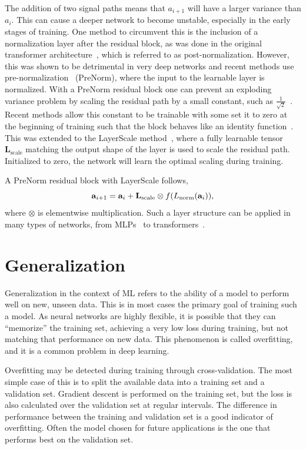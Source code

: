 The addition of two signal paths means that $a_{i+1}$ will have a larger variance than $a_i$.
This can cause a deeper network to become unstable, especially in the early stages of training.
One method to circumvent this is the inclusion of a normalization layer after the residual block, as was done in the original transformer architecture~\cite{Attention}, which is referred to as post-normalization.
However, this was shown to be detrimental in very deep networks and recent methods use pre-normalization~\cite{PreLN} (PreNorm), where the input to the learnable layer is normalized.
With a PreNorm residual block one can prevent an exploding variance problem by scaling the residual path by a small constant, such as $\frac{1}{\sqrt{2}}$~\cite{StyleGAN2}.
Recent methods allow this constant to be trainable with some set it to zero at the beginning of training such that the block behaves like an identity function~\cite{ReZero, SkipInit, Fixup}.
This was extended to the LayerScale method~\cite{GoingDeeper}, where a fully learnable tensor $\mathbf{L}_\text{scale}$ matching the output shape of the layer is used to scale the residual path.
Initialized to zero, the network will learn the optimal scaling during training.

A PreNorm residual block with LayerScale follows,
\begin{equation}
    \mathbf{a}_{i+1} = \mathbf{a}_i + \mathbf{L}_\text{scale} \otimes f( L_{\text{norm}}(\mathbf{a}_i) ),
\end{equation}
where $\otimes$ is elementwise multiplication.
Such a layer structure can be applied in many types of networks, from MLPs~\cite{InvertedBottleneck} to transformers~\cite{GoingDeeper}.

\section{Generalization}

Generalization in the context of ML refers to the ability of a model to perform well on new, unseen data.
This is in most cases the primary goal of training such a model.
As neural networks are highly flexible, it is possible that they can ``memorize'' the training set, achieving a very low loss during training, but not matching that performance on new data.
This phenomenon is called overfitting, and it is a common problem in deep learning.

Overfitting may be detected during training through cross-validation.
The most simple case of this is to split the available data into a training set and a validation set.
Gradient descent is performed on the training set, but the loss is also calculated over the validation set at regular intervals.
The difference in performance between the training and validation set is a good indicator of overfitting.
Often the model chosen for future applications is the one that performs best on the validation set.

